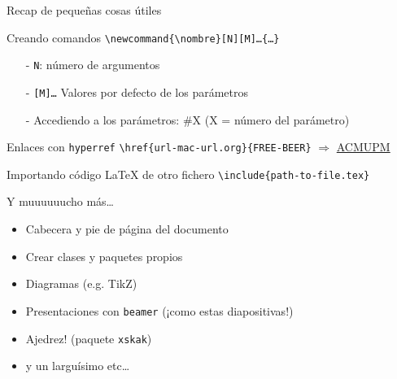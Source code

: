 \begin{frame}{Recap de pequeñas cosas útiles}
    \begin{block}{Creando comandos}
        \texttt{\textbackslash newcommand\{\textbackslash nombre\}[N][M]\ldots{}\{\ldots{}\}}

        \begin{itemize}
            \item[-] \texttt{N}: número de argumentos
            \item[-] \texttt{[M]\ldots{}}\: Valores por defecto de los parámetros
            \item[-] Accediendo a los parámetros: \#X (X = número del parámetro)
        \end{itemize}
    \end{block}

    \pause
    
    \begin{block}{Enlaces con \texttt{hyperref}}
        \texttt{\textbackslash href\{url-mac-url.org\}\{FREE-BEER\}} $\Rightarrow$ \href{https://upm.acm.org/wp/}{ACMUPM}
    \end{block}

    \pause

    \begin{block}{Importando código \LaTeX{} de otro fichero}
        \texttt{\textbackslash include\{path-to-file.tex\}}
    \end{block}
    
\end{frame}


\begin{frame}{Y muuuuuucho más\ldots{}}
    \begin{itemize}
        \item Cabecera y pie de página del documento\pause
        \item Crear clases y paquetes propios\pause
        \item Diagramas (e.g. TikZ)\pause
        \item Presentaciones con \texttt{beamer} (¡como estas diapositivas!) 
        \item Ajedrez! (paquete \texttt{xskak})\pause
        \item y un larguísimo etc\ldots{}
    \end{itemize}
\end{frame}
